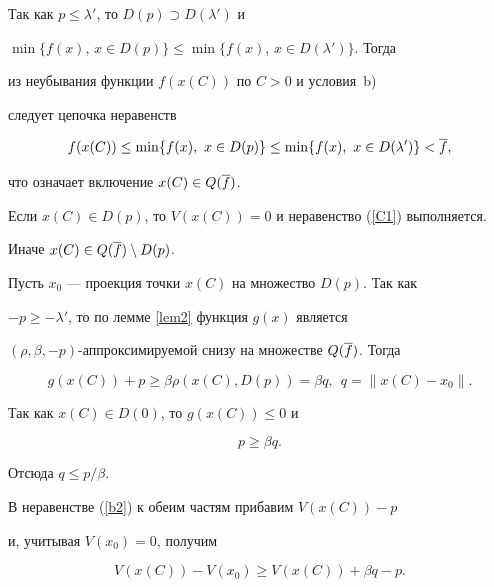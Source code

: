 \begin{pf}


Так как $p\leq\lambda'$, то $D(p)\supset D(\lambda')$ и 


$\min\{f(x)$, $x\in D(p)\}\leq \min\{f(x)$, $x\in D(\lambda')\}$. Тогда


из неубывания функции $f(x(C))$ по $C>0$ и условия~b)


следует цепочка неравенств


$$


f(x(C))\leq\min\{f(x),\ x\in D(p)\}\leq \min\{f(x),\ x\in D(\lambda')\}<\o f,


$$


что означает включение $x(C)\in Q(\overline f)$.





Если $x(C)\in D(p)$, то $V(x(C))=0$ и неравенство (\ref{C1}) выполняется. 


Иначе $x(C)\in Q(\overline f)\setminus D(p)$.





Пусть $x_0$ --- проекция точки $x(C)$ на множество $D(p)$. Так как


$-p\geq-\lambda'$, то по лемме \ref{lem2} функция $g(x)$ является


$(\rho,\beta,-p)$-аппроксимируемой снизу на множестве $Q(\overline f)$. Тогда


$$




g(x(C))+p\geq\beta\rho(x(C),D(p))=\beta q,\ \ q=\|x(C)-x_0\|.




$$


Так как $x(C)\in D(0)$, то $g(x(C))\leq 0$ и


\begin{equation}\label{b2}


p\geq\beta q.


\end{equation}


Отсюда $q\leq p/\beta$.


В неравенстве (\ref{b2}) к обеим частям прибавим $V(x(C))-p$ 


и, учитывая $V(x_0)=0$, получим


\begin{equation}\label{b3}


V(x(C))-V(x_0)\geq V(x(C))+\beta q-p.



\end{equation}
\end{pf}
